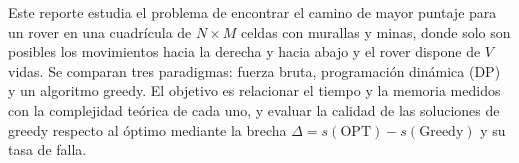 Este reporte estudia el problema de encontrar el camino de mayor puntaje para
un rover en una cuadrícula de $N\times M$ celdas con murallas y minas, donde
solo son posibles los movimientos hacia la derecha y hacia abajo y el rover
dispone de $V$ vidas. Se comparan tres paradigmas: fuerza bruta, programación
dinámica (DP) y un algoritmo greedy. El objetivo es relacionar el tiempo y la
memoria medidos con la complejidad teórica de cada uno, y evaluar la calidad
de las soluciones de greedy respecto al óptimo mediante la brecha
$\Delta = s(\mathrm{OPT}) - s(\mathrm{Greedy})$ y su tasa de falla.
